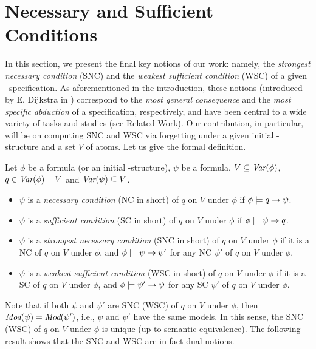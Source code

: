 \documentclass{article}
\begin{document}
\section{Necessary and  Sufficient Conditions}
\label{ns_conditions}
In this section, we present the final key notions of our work:  namely, the \emph{strongest necessary condition} (SNC) and the \emph{weakest sufficient condition}  (WSC)  of a given \CTL\ specification.  As aforementioned in the introduction, these notions (introduced by E. Dijkstra in \cite{DBLP:journals/cacm/Dijkstra75}) correspond to the \emph{most general consequence} and the \emph{most specific abduction} of a specification, respectively, and have been central to a wide variety of tasks and studies (see Related Work). Our contribution, in particular, will be on computing SNC and WSC via forgetting under a given initial \MPK-structure and a set $V$ of atoms.  Let us give the formal definition. %
\begin{definition}\label{def:NC:SC}
Let $\phi$ be a formula (or an initial \MPK-structure), $\psi$ be a formula, $V \subseteq \textit{Var}(\phi)$, $q\in\textit{Var}(\phi)- V$
and $\textit{Var}(\psi)\subseteq V$.
\begin{itemize}
  \item $\psi$  is a {\em necessary condition} (NC in short) of $q$ on $V$ under $\phi$
    if $\phi \models q \rightarrow \psi$.
  \item $\psi$  is a {\em sufficient condition} (SC in short) of $q$ on $V$ under $\phi$
    if $\phi \models \psi\rightarrow q$.
  \item $\psi$  is a {\em strongest necessary condition} (SNC in short)
  of $q$ on $V$ under $\phi$
    if it is a NC of $q$ on $V$ under $\phi$, and $\phi\models\psi\rightarrow\psi'$
    for any NC $\psi'$ of $q$ on $V$ under $\phi$.

    \item $\psi$  is a {\em weakest sufficient condition} (WSC in short)
  of $q$ on $V$ under $\phi$
    if it is a SC of $q$ on $V$ under $\phi$, and $\phi\models\psi'\rightarrow\psi$
    for any SC $\psi'$ of $q$ on $V$ under $\phi$.
\end{itemize}
\end{definition}
Note that if both $\psi$ and $\psi'$ are SNC (WSC) of $q$ on $V$ under $\phi$, then
$\textit{Mod}(\psi)=\textit{Mod}(\psi')$, i.e., $\psi$ and $\psi'$ have the same models.
In this sense, the SNC (WSC) of $q$ on $V$ under $\phi$ is unique (up to semantic equivalence). The following result shows that the SNC and WSC are in fact dual notions.
\end{document}
